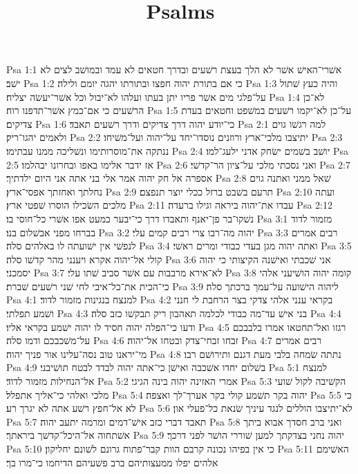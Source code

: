 

\title{Psalms}

Psa 1:1  אשׁרי־האישׁ אשׁר לא הלך בעצת רשׁעים ובדרך חטאים לא עמד ובמושׁב לצים לא ישׁב׃
Psa 1:2  כי אם בתורת יהוה חפצו ובתורתו יהגה יומם ולילה׃
Psa 1:3  והיה כעץ שׁתול על־פלגי מים אשׁר פריו יתן בעתו ועלהו לא־יבול וכל אשׁר־יעשׂה יצליח׃
Psa 1:4  לא־כן הרשׁעים כי אם־כמץ אשׁר־תדפנו רוח׃
Psa 1:5  על־כן לא־יקמו רשׁעים במשׁפט וחטאים בעדת צדיקים׃
Psa 1:6  כי־יודע יהוה דרך צדיקים ודרך רשׁעים תאבד׃
Psa 2:1  למה רגשׁו גוים ולאמים יהגו־ריק׃
Psa 2:2  יתיצבו מלכי־ארץ ורוזנים נוסדו־יחד על־יהוה ועל־משׁיחו׃
Psa 2:3  ננתקה את־מוסרותימו ונשׁליכה ממנו עבתימו׃
Psa 2:4  יושׁב בשׁמים ישׂחק אדני ילעג־למו׃
Psa 2:5  אז ידבר אלימו באפו ובחרונו יבהלמו׃
Psa 2:6  ואני נסכתי מלכי על־ציון הר־קדשׁי׃
Psa 2:7  אספרה אל חק יהוה אמר אלי בני אתה אני היום ילדתיך׃
Psa 2:8  שׁאל ממני ואתנה גוים נחלתך ואחזתך אפסי־ארץ׃
Psa 2:9  תרעם בשׁבט ברזל ככלי יוצר תנפצם׃
Psa 2:10  ועתה מלכים השׂכילו הוסרו שׁפטי ארץ׃
Psa 2:11  עבדו את־יהוה ביראה וגילו ברעדה׃
Psa 2:12  נשׁקו־בר פן־יאנף ותאבדו דרך כי־יבער כמעט אפו אשׁרי כל־חוסי בו׃
Psa 3:1  מזמור לדוד בברחו מפני אבשׁלום בנו׃
Psa 3:2  יהוה מה־רבו צרי רבים קמים עלי׃
Psa 3:3  רבים אמרים לנפשׁי אין ישׁועתה לו באלהים סלה׃
Psa 3:4  ואתה יהוה מגן בעדי כבודי ומרים ראשׁי׃
Psa 3:5  קולי אל־יהוה אקרא ויענני מהר קדשׁו סלה׃
Psa 3:6  אני שׁכבתי ואישׁנה הקיצותי כי יהוה יסמכני׃
Psa 3:7  לא־אירא מרבבות עם אשׁר סביב שׁתו עלי׃
Psa 3:8  קומה יהוה הושׁיעני אלהי כי־הכית את־כל־איבי לחי שׁני רשׁעים שׁברת׃
Psa 3:9  ליהוה הישׁועה על־עמך ברכתך סלה׃
Psa 4:1  למנצח בנגינות מזמור לדוד׃
Psa 4:2  בקראי ענני אלהי צדקי בצר הרחבת לי חנני ושׁמע תפלתי׃
Psa 4:3  בני אישׁ עד־מה כבודי לכלמה תאהבון ריק תבקשׁו כזב סלה׃
Psa 4:4  ודעו כי־הפלה יהוה חסיד לו יהוה ישׁמע בקראי אליו׃
Psa 4:5  רגזו ואל־תחטאו אמרו בלבבכם על־משׁכבכם ודמו סלה׃
Psa 4:6  זבחו זבחי־צדק ובטחו אל־יהוה׃
Psa 4:7  רבים אמרים מי־יראנו טוב נסה־עלינו אור פניך יהוה׃
Psa 4:8  נתתה שׂמחה בלבי מעת דגנם ותירושׁם רבו׃
Psa 4:9  בשׁלום יחדו אשׁכבה ואישׁן כי־אתה יהוה לבדד לבטח תושׁיבני׃
Psa 5:1  למנצח אל־הנחילות מזמור לדוד׃
Psa 5:2  אמרי האזינה יהוה בינה הגיגי׃
Psa 5:3  הקשׁיבה לקול שׁועי מלכי ואלהי כי־אליך אתפלל׃
Psa 5:4  יהוה בקר תשׁמע קולי בקר אערך־לך ואצפה׃
Psa 5:5  כי לא אל־חפץ רשׁע אתה לא יגרך רע׃
Psa 5:6  לא־יתיצבו הוללים לנגד עיניך שׂנאת כל־פעלי און׃
Psa 5:7  תאבד דברי כזב אישׁ־דמים ומרמה יתעב יהוה׃
Psa 5:8  ואני ברב חסדך אבוא ביתך אשׁתחוה אל־היכל־קדשׁך ביראתך׃
Psa 5:9  יהוה נחני בצדקתך למען שׁוררי הושׁר לפני דרכך׃
Psa 5:10  כי אין בפיהו נכונה קרבם הוות קבר־פתוח גרונם לשׁונם יחליקון׃
Psa 5:11  האשׁימם אלהים יפלו ממעצותיהם ברב פשׁעיהם הדיחמו כי־מרו בך׃
